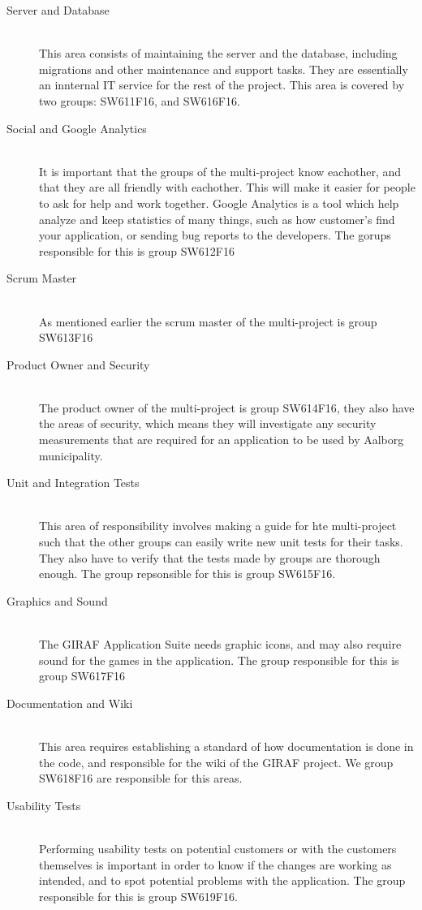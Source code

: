 \begin{description}
	\item[Server and Database] \hfill \\
	This area consists of maintaining the server and the database, including migrations and other maintenance and support tasks. They are essentially an innternal IT service for the rest of the project. This area is covered by two groups: SW611F16, and SW616F16.
	\item[Social and Google Analytics] \hfill \\
	It is important that the groups of the multi-project know eachother, and that they are all friendly with eachother. 
	This will make it easier for people to ask for help and work together. 
	Google Analytics is a tool which help analyze and keep statistics of many things, such as how customer's find your application, or sending bug reports to the developers.
	The gorups responsible for this is group SW612F16
	\item[Scrum Master] \hfill \\
	As mentioned earlier the scrum master of the multi-project is group SW613F16
	\item[Product Owner and Security] \hfill \\
	The product owner of the multi-project is group SW614F16, they also have the areas of security, which means they will investigate any security measurements that are required for an application to be used by Aalborg municipality.
	\item[Unit and Integration Tests] \hfill \\
	This area of responsibility involves making a guide for hte multi-project such that the other groups can easily write new unit tests for their tasks.
	They also have to verify that the tests made by groups are thorough enough.
	The group repsonsible for this is group SW615F16.
	\item[Graphics and Sound] \hfill \\
	The GIRAF Application Suite needs graphic icons, and may also require sound for the games in the application. 
	The group responsible for this is group SW617F16
	\item[Documentation and Wiki] \hfill \\
	This area requires establishing a standard of how documentation is done in the code, and responsible for the wiki of the GIRAF project. We group SW618F16 are responsible for this areas.
	\item[Usability Tests] \hfill \\
	Performing usability tests on potential customers or with the customers themselves is important in order to know if the changes are working as intended, and to spot potential problems with the application. The group responsible for this is group SW619F16.	
\end{description}

